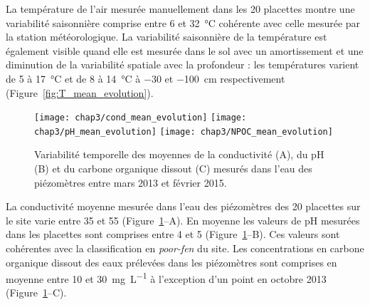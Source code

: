 La température de l'air mesurée manuellement dans les 20 placettes montre une variabilité saisonnière comprise entre 6 et \SI{32}{\degreeCelsius} cohérente avec celle mesurée par la station météorologique. 
La variabilité saisonnière de la température est également visible quand elle est mesurée dans le sol avec un amortissement et une diminution de la variabilité spatiale avec la profondeur : les températures varient de 5 à \SI{17}{\degreeCelsius} et de 8 à \SI{14}{\degreeCelsius} à \num{-30} et \SI{-100}{\centi\metre} respectivement (Figure~\ref{fig:T_mean_evolution}).

\begin{figure}
\centering
\texttt{[image: chap3/cond\_mean\_evolution]}
\texttt{[image: chap3/pH\_mean\_evolution]}
\texttt{[image: chap3/NPOC\_mean\_evolution]}
\caption{Variabilité temporelle des moyennes de la conductivité (A), du pH (B) et du carbone organique dissout (C) mesurés dans l'eau des piézomètres entre mars 2013 et février 2015.}
\label{fig:wtr_phychim}
\end{figure}



%

La conductivité moyenne mesurée dans l'eau des piézomètres des 20 placettes sur le site varie entre \num{35} et \SI{55}{\usml} (Figure~\ref{fig:wtr_phychim}--A).
En moyenne les valeurs de pH mesurées dans les placettes sont comprises entre 4 et 5 (Figure~\ref{fig:wtr_phychim}--B).
Ces valeurs sont cohérentes avec la classification en \textit{poor-fen} du site.
Les concentrations en carbone organique dissout des eaux prélevées dans les piézomètres sont comprises en moyenne entre \num{10} et \SI{30}{\milli\gram\per\liter} à l'exception d'un point en octobre 2013 (Figure~\ref{fig:wtr_phychim}--C).



